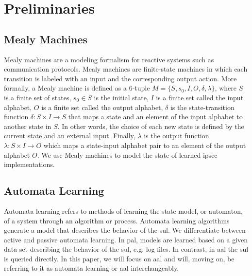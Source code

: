 %
%
% 
% 
% 

\chapter{Preliminaries}

\label{chap:Preliminaries}

\section{Mealy Machines}
Mealy machines are a modeling formalism for reactive systems such as communication protocols. Mealy machines are finite-state machines in which each transition is labeled with an input and the corresponding output action. More formally, a Mealy machine is defined as a 6-tuple $M = \{S, s_0, I, O, \delta, \lambda\}$, where $S$ is a finite set of states, $s_0 \in S$ is the initial state, $I$ is a finite set called the input alphabet, $O$ is a finite set called the output alphabet, $\delta$ is the state-transition function $\delta \colon S \times I \rightarrow S$ that maps a state and an element of the input alphabet to another state in $S$. In other words, the choice of each new state is defined by the current state and an external input. Finally, $\lambda$ is the output function $\lambda \colon S \times I \rightarrow O$ which maps a state-input alphabet pair to an element of the output alphabet $O$. We use Mealy machines to model the state of learned \ac{ipsec} implementations.

\section{Automata Learning}

Automata learning refers to methods of learning the state model, or automaton, of a system through an algorithm or process. Automata learning algorithms generate a model that describes the behavior of the \ac{sul}. We differentiate between active and passive automata learning. In \ac{pal}, models are learned based on a given data set describing the behavior of the \ac{sul}, e.g. log files. In contrast, in \ac{aal} the \ac{sul} is queried directly. In this paper, we will focus on \ac{aal} and will, moving on, be referring to it as automata learning or \ac{aal} interchangeably. 

